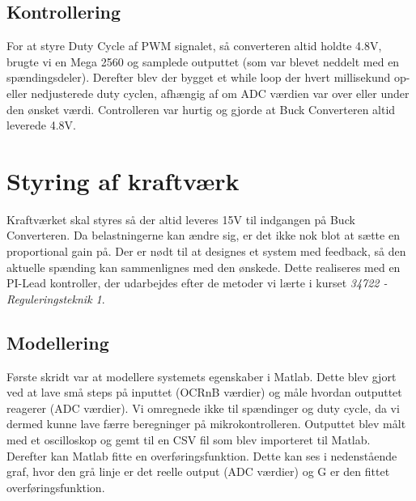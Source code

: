 \documentclass[../main.tex]{subfiles}
\begin{document}
\subsubsection{}

\subsection{Kontrollering}
For at styre Duty Cycle af PWM signalet, så converteren altid holdte 4.8V, brugte vi en Mega 2560 og samplede outputtet (som var blevet neddelt med en spændingsdeler). Derefter blev der bygget et while loop der hvert millisekund op- eller nedjusterede duty cyclen, afhængig af om ADC værdien var over eller under den ønsket værdi. Controlleren var hurtig og gjorde at Buck Converteren altid leverede 4.8V. 

\section{Styring af kraftværk}
Kraftværket skal styres så der altid leveres 15V til indgangen på Buck Converteren. Da belastningerne kan ændre sig, er det ikke nok blot at sætte en proportional gain på. Der er nødt til at designes et system med feedback, så den aktuelle spænding kan sammenlignes med den ønskede. Dette realiseres med en PI-Lead kontroller, der udarbejdes efter de metoder vi lærte i kurset \emph{34722 - Reguleringsteknik 1}.

\subsection{Modellering}
Første skridt var at modellere systemets egenskaber i Matlab. Dette blev gjort ved at lave små steps på inputtet (OCRnB værdier) og måle hvordan outputtet reagerer (ADC værdier). Vi omregnede ikke til spændinger og duty cycle, da vi dermed kunne lave færre beregninger på mikrokontrolleren. Outputtet blev målt med et oscilloskop og gemt til en CSV fil som blev importeret til Matlab. Derefter kan Matlab fitte en overføringsfunktion. Dette kan ses i nedenstående graf, hvor den grå linje er det reelle output (ADC værdier) og G er den fittet overføringsfunktion. 
\end{document}
